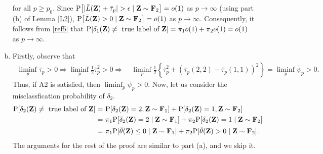 \documentclass[twoside]{article}
\newcommand{\bZ}{\mathbf{Z}}
\newcommand{\bF}{\mathbf{F}}
\newcommand{\0}{\mathbf{0}}
\newcommand{\1}{\mathbf{1}}
\numberwithin{equation}{section}
\begin{document}
\begin{enumerate}[(a)]
for all $p\geq p_0$. Since ${\rm P}\big [|\bar{L}(\bZ) + \bar{\tau}_p|>\epsilon\mid \bZ\sim\bF_2\big ]=o(1)$ as $p\to\infty$ (using part (b) of Lemma \ref{L2}), ${\rm P}\big [\bar{L}(\bZ)> 0\mid \bZ\sim\bF_2\big ]=o(1)$ as $p\to\infty$. Consequently, it follows from \eqref{ref5} that ${\rm P}[\delta_1(\bZ)\neq \text{ true label of }\bZ]=\pi_1 o(1) + \pi_2o(1)=o(1)$ as $p\to\infty$.
\item Firstly, observe that
\begin{align*}
\ \liminf\limits_{p}\bar{\tau}_p>0
\Rightarrow  \liminf\limits_{p}\frac{1}{2}\bar{\tau}_p^2>0
\Rightarrow &\ \liminf\limits_{p}\frac{1}{2}\left \{\bar{\tau}_p^2 + (\bar{\tau}_p(2,2) - \bar{\tau}_p(1,1))^2\right \}=\liminf_p\bar{\psi}_p>0.
\end{align*}
Thus, if A2 is satisfied, then $\liminf_p\bar{\psi}_p>0.$ Now, let us consider the misclassfication probability of $\delta_2.$
\begin{align}\label{ref9}
 {\rm P}[\delta_2(\bZ)\neq \text{ true label of }\bZ]
 =&\ {\rm P}[\delta_2(\bZ)=2, \bZ\sim\bF_1] + {\rm P}[\delta_2(\bZ)=1, \bZ\sim\bF_2]\nonumber \\
 =&\ \pi_1 {\rm P}[\delta_2(\bZ)=2\mid \bZ\sim\bF_1]+ \pi_2{\rm P}[\delta_2(\bZ)=1\mid \bZ\sim\bF_2]\nonumber \\
 =&\ \pi_1 {\rm P}[\bar{\theta}(\bZ)\leq 0\mid \bZ\sim\bF_1]+ \pi_2{\rm P}[\bar{\theta}(\bZ)> 0\mid \bZ\sim\bF_2].
\end{align}
The arguments for the rest of the proof are similar to part (a), and we skip it.

\end{enumerate}
\end{document}
